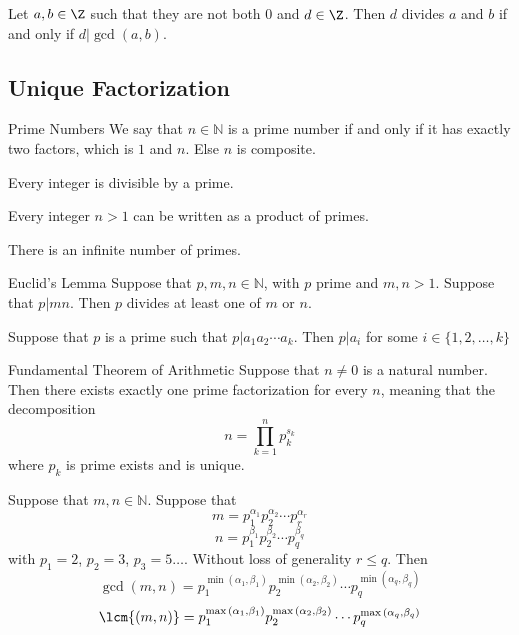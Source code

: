 \documentclass[a4paper]{article}
\begin{document}
\begin{crl}{}{} Let $a,b\in\Z$ such that they are not both $0$ and $d\in\Z$. Then $d$ divides $a$ and $b$ if and only if $d|\gcd(a,b)$. 
\end{crl}

\subsection{Unique Factorization}
\begin{defn}{Prime Numbers}{} We say that $n\in\mathbb{N}$ is a prime number if and only if it has exactly two factors, which is $1$ and $n$. Else $n$ is composite. 
\end{defn}

\begin{lmm}{}{} Every integer is divisible by a prime. 
\end{lmm}

\begin{lmm}{}{} Every integer $n>1$ can be written as a product of primes. 
\end{lmm}

\begin{thm}{}{} There is an infinite number of primes. 
\end{thm}

\begin{prp}{Euclid's Lemma}{} Suppose that $p,m,n\in\mathbb{N}$, with $p$ prime and $m,n>1$. Suppose that $p|mn$. Then $p$ divides at least one of $m$ or $n$. 
\end{prp}

\begin{prp}{}{} Suppose that $p$ is a prime such that $p|a_1a_2\cdots a_k$. Then $p|a_i$ for some $i\in\{1,2,\dots,k\}$
\end{prp}

\begin{thm}{Fundamental Theorem of Arithmetic}{} Suppose that $n\neq 0$ is a natural number. Then there exists exactly one prime factorization for every $n$, meaning that the decomposition $$n=\prod_{k=1}^np_k^{s_k}$$ where $p_k$ is prime exists and is unique. 
\end{thm}

\begin{thm}{}{} Suppose that $m,n\in\mathbb{N}$. Suppose that 
$$m=p_1^{\alpha_1}p_2^{\alpha_2}\cdots p_r^{\alpha_r}$$
$$n=p_1^{\beta_1}p_2^{\beta_2}\cdots p_q^{\beta_q}$$
with $p_1=2$, $p_2=3$, $p_3=5\dots$. Without loss of generality $r\leq q$. Then $$\gcd{(m,n)}=p_1^{\min{(\alpha_1,\beta_1)}}p_2^{\min{(\alpha_2,\beta_2)}}\cdots p_q^{\min{(\alpha_q,\beta_q)}}$$
$$\lcm{(m,n)}=p_1^{\max{(\alpha_1,\beta_1)}}p_2^{\max{(\alpha_2,\beta_2)}}\cdots p_q^{\max{(\alpha_q,\beta_q)}}$$
\end{thm}
\end{document}
